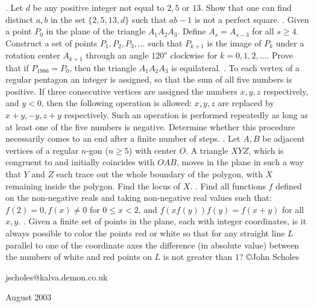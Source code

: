 \nopagenumbers
{}
\vskip 25pt
. Let $d$ be any positive integer not equal to $2, 5$ or $13$. Show that one can find distinct $a,b$ in the set $\{2,5,13,d\}$ such that $ab-1$ is not a perfect square.
\vskip 12pt
. Given a point $P_0$ in the plane of the triangle $A_1A_2A_3$. Define  $A_s=A_{s-3}$ for all $s\ge4$. Construct a set of points $P_1,P_2,P_3,\ldots$ such that $P_{k+1}$ is the image of $P_k$ under a rotation center $A_{k+1}$ through an angle $120^o$ clockwise for $k=0,1,2,\ldots$. Prove that if $P_{1986}=P_0$, then the triangle $A_1A_2A_3$ is equilateral.
\vskip 12pt
. To each vertex of a regular pentagon an integer is assigned, so that the sum of all five numbers is positive. If three consecutive vertices are assigned the numbers $x,y,z$ respectively, and $y<0$, then the following operation is allowed: $x,y,z$ are replaced by $x+y,-y,z+y$ respectively. Such an operation is performed repeatedly as long as at least one of the five numbers is negative. Determine whether this procedure necessarily comes to an end after a finite number of steps.
\vskip 12pt
. Let $A,B$ be adjacent vertices of a regular $n$-gon ($n\ge5$) with center $O$. A triangle $XYZ$, which is congruent to and initially coincides with $OAB$, moves in the plane in such a way that $Y$ and $Z$ each trace out the whole boundary of the polygon, with $X$ remaining inside the polygon. Find the locus of $X$.
\vskip 12pt
. Find all functions $f$ defined on the non-negative reals and taking non-negative real values such that: $f(2)=0,f(x)\ne0$ for $0\le x<2$, and $f(xf(y))f(y)=f(x+y)$ for all $x,y$.
\vskip 12pt
. Given a finite set of points in the plane, each with integer coordinates, is it always possible to color the points red or white so that for any straight line $L$ parallel to one of the coordinate axes the difference (in absolute value) between the numbers of white and red points on $L$ is not greater than $1$?
\vskip 20pt
\noindent \copyright John Scholes

\noindent jscholes@kalva.demon.co.uk

 August 2003

\bye
